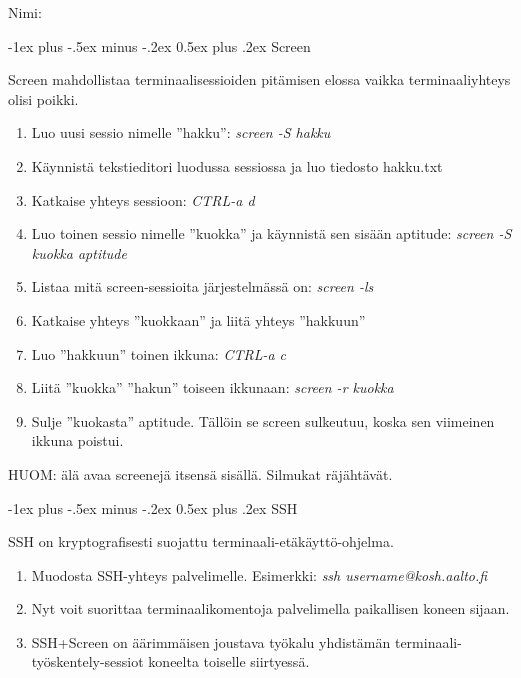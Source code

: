 \documentclass[12pt,portrait,a4]{article}
\makeatletter
\renewcommand{\section}{\@startsection{section}{1}{0mm}%
                                {-1ex plus -.5ex minus -.2ex}%
                                {0.5ex plus .2ex}%
                                {\normalfont\large\bfseries}}
\makeatother
\begin{document}
\raggedbottom

\begin{multicols}{2}
\setlength{\premulticols}{1pt}
\setlength{\postmulticols}{1pt}
\setlength{\multicolsep}{1pt}
\setlength{\columnsep}{2pt}

Nimi:\hrulefill


\end{multicols}

\section{Screen}

Screen mahdollistaa terminaalisessioiden pitämisen elossa
vaikka terminaaliyhteys olisi poikki.

\begin{enumerate}
\item Luo uusi sessio nimelle ''hakku'': \emph{screen -S hakku}
\item Käynnistä tekstieditori luodussa sessiossa ja luo tiedosto hakku.txt
\item Katkaise yhteys sessioon: \emph{CTRL-a d}
\item Luo toinen sessio nimelle ''kuokka'' ja käynnistä sen sisään aptitude: \emph{screen -S kuokka aptitude}
\item Listaa mitä screen-sessioita järjestelmässä on: \emph{screen -ls}
\item Katkaise yhteys ''kuokkaan'' ja liitä yhteys ''hakkuun''
\item Luo ''hakkuun'' toinen ikkuna: \emph{CTRL-a c}
\item Liitä ''kuokka'' ''hakun'' toiseen ikkunaan: \emph{screen -r kuokka}
\item Sulje ''kuokasta'' aptitude.  Tällöin se screen sulkeutuu, koska sen
viimeinen ikkuna poistui.
\end{enumerate}

HUOM: älä avaa screenejä itsensä sisällä.  Silmukat räjähtävät.

\section{SSH}

SSH on kryptografisesti suojattu terminaali-etäkäyttö-ohjelma.

\begin{enumerate}
\item Muodosta SSH-yhteys palvelimelle.  Esimerkki: \emph{ssh username@kosh.aalto.fi}
\item Nyt voit suorittaa terminaalikomentoja palvelimella paikallisen koneen sijaan.
\item SSH+Screen on äärimmäisen joustava työkalu yhdistämän
terminaali-työskentely-sessiot koneelta toiselle siirtyessä.
\end{enumerate}
\end{document}
